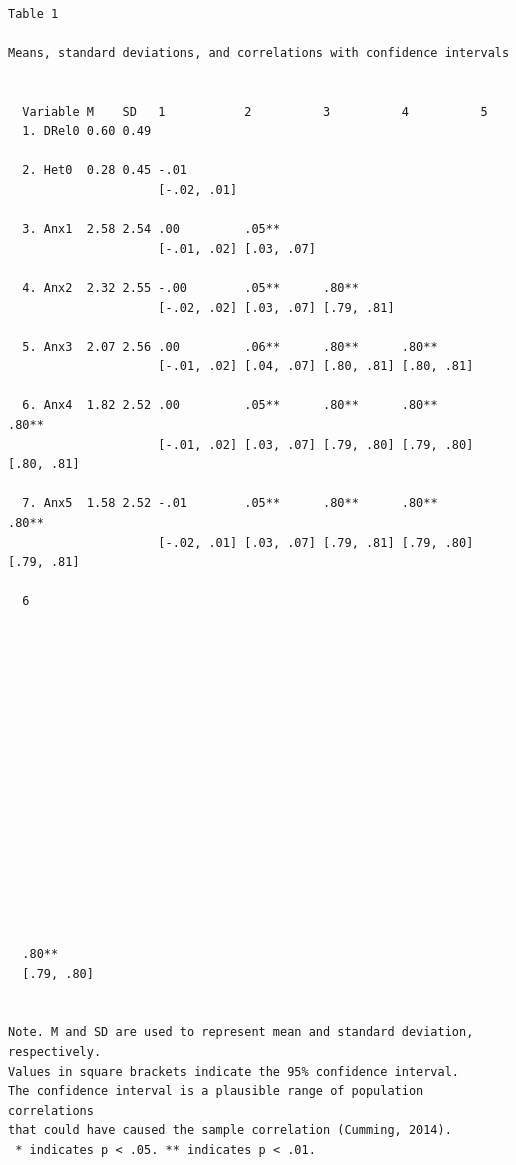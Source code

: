 \documentclass[
  11pt,
]{book}
\begin{document}
\begin{verbatim}

Table 1 

Means, standard deviations, and correlations with confidence intervals
 

  Variable M    SD   1           2          3          4          5         
  1. DRel0 0.60 0.49                                                        
                                                                            
  2. Het0  0.28 0.45 -.01                                                   
                     [-.02, .01]                                            
                                                                            
  3. Anx1  2.58 2.54 .00         .05**                                      
                     [-.01, .02] [.03, .07]                                 
                                                                            
  4. Anx2  2.32 2.55 -.00        .05**      .80**                           
                     [-.02, .02] [.03, .07] [.79, .81]                      
                                                                            
  5. Anx3  2.07 2.56 .00         .06**      .80**      .80**                
                     [-.01, .02] [.04, .07] [.80, .81] [.80, .81]           
                                                                            
  6. Anx4  1.82 2.52 .00         .05**      .80**      .80**      .80**     
                     [-.01, .02] [.03, .07] [.79, .80] [.79, .80] [.80, .81]
                                                                            
  7. Anx5  1.58 2.52 -.01        .05**      .80**      .80**      .80**     
                     [-.02, .01] [.03, .07] [.79, .81] [.79, .80] [.79, .81]
                                                                            
  6         
            
            
            
            
            
            
            
            
            
            
            
            
            
            
            
            
            
  .80**     
  [.79, .80]
            

Note. M and SD are used to represent mean and standard deviation, respectively.
Values in square brackets indicate the 95% confidence interval.
The confidence interval is a plausible range of population correlations 
that could have caused the sample correlation (Cumming, 2014).
 * indicates p < .05. ** indicates p < .01.
 
\end{verbatim}
\end{document}
